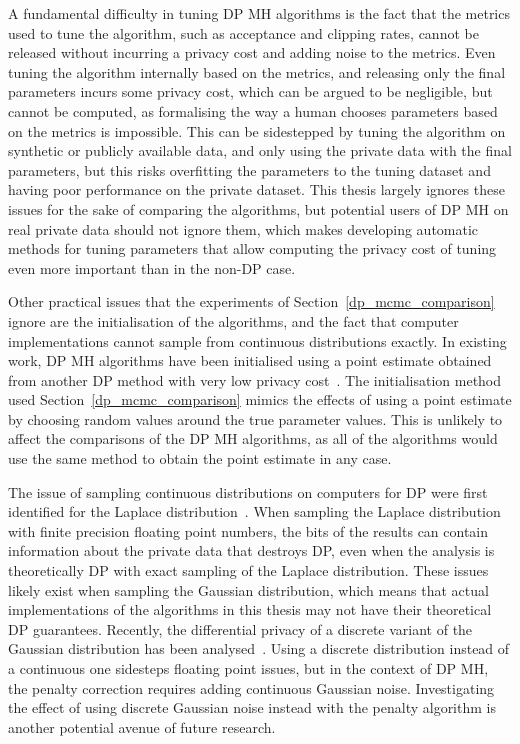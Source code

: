 \documentclass[english,twoside,openright]{HYgraduMLDS}
\begin{document}
A fundamental difficulty in tuning DP MH algorithms is the fact that the
metrics used to tune the algorithm, such as acceptance and clipping rates,
cannot be released without incurring a privacy cost and adding noise to the
metrics. Even tuning the algorithm
internally based on the metrics, and releasing only the final parameters incurs
some privacy cost, which can be argued to be negligible, but cannot be
computed, as formalising the way a human chooses parameters based on the metrics
is impossible. This can be sidestepped by tuning the algorithm on synthetic or
publicly available data, and only using the private data with the final parameters,
but this risks overfitting the parameters to the tuning dataset and having
poor performance on the private dataset.
This thesis largely ignores these issues for the sake of comparing
the algorithms, but potential users of DP MH on real private data should not
ignore them, which makes developing automatic methods for tuning parameters
that allow computing the privacy cost of tuning
even more important than in the non-DP case.

Other practical issues that the experiments of Section~\ref{dp_mcmc_comparison}
ignore are the initialisation of the algorithms, and the fact that
computer implementations cannot sample from continuous distributions exactly.
In existing work, DP MH algorithms have been initialised using a point
estimate obtained from another DP method with very low privacy
cost~\cite{HeikkilaJDH19, WFS15}. The initialisation method used
Section~\ref{dp_mcmc_comparison} mimics the effects of using a point estimate by
choosing random values around the true parameter values. This is unlikely to
affect the comparisons of the DP MH algorithms, as all of the algorithms
would use the same method to obtain the point estimate in any case.

The issue of sampling continuous distributions on computers for DP were first
identified for the Laplace distribution~\cite{Mir12}. When sampling the Laplace
distribution with finite precision floating point numbers, the bits of the
results can contain information about the private data that destroys DP, even
when the analysis is theoretically DP with exact sampling of the Laplace
distribution. These issues likely exist when sampling the Gaussian distribution,
which means that actual implementations of the algorithms in this thesis may
not have their theoretical DP guarantees. Recently, the differential privacy
of a discrete variant of the Gaussian distribution has been
analysed~\cite{C0S20}. Using a discrete distribution instead of a continuous one
sidesteps floating point issues, but in the context of DP MH, the penalty
correction requires adding continuous Gaussian noise. Investigating the effect
of using discrete Gaussian noise instead with the penalty algorithm is another
potential avenue of future research.
\end{document}
